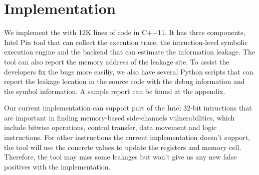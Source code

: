 \section{Implementation}
We implement the \tool{} with 12K lines of code in C++11. It has three components, Intel
Pin tool that can collect the execution trace, the intruction-level symbolic execution
engine and the backend that can estimate the information leakage. The tool can also report 
the memory address of the leakage site. To assist the developers fix the bugs more easiliy,
we also have several Python scripts that can report the leakage location in the source code 
with the debug information and the symbol information. A sample report can be found at the 
appendix.

\begin{table}[h]
    \centering
    \caption{\tool{}'s main components and their LoC}
\end{table}

Our current implementation can support part of the Intel 32-bit intructions that are important 
in finding memory-based side-channels vulnerabilities, which include bitwise operations, 
control transfer, data movement and logic instructions. For other 
instructions the current implementation doesn't support, 
the tool will use the concrete values to update the registers and memory cell.
Therefore, the tool may miss some leakages but won't give us any new false positives with the
implementation.